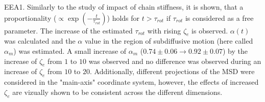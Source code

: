 \documentclass[
    paper=A4,pagesize=automedia,fontsize=12pt,
    BCOR=15mm,DIV=22,
    twoside,headinclude,footinclude=false,
    fleqn,             %
    bibliography=totocnumbered,          %
    listof=totoc,                %
    listof=flat,                 %
    cleardoublepage=empty      %
    numbers=endperiod
]{scrartcl}
\begin{document}
EEA1. Similarly to the study of impact of chain stiffness, it is shown,
that a proportionality ($\propto \exp\left(-\frac{t}{\tau_{rot}}\right)$) holds
for $t>\tau_{rot}$ if $\tau_{rot}$ is considered as a free parameter.
The increase of the estimated $\tau_{rot}$ with rising $\zeta_e$ is observed.
$\alpha(t)$ was calculated and the $\alpha$ value in the region of subdiffusive motion
(here called $\alpha_m$) was estimated. A small
increase of $\alpha_m$
($0.74 \pm 0.06 \rightarrow 0.92 \pm 0.07$) by the 
increase of $\zeta_e$ from $1$ to $10$ was observed and no difference was observed
during an increase of $\zeta_e$ from $10$ to $20$. Additionally, different projections
of the MSD were considered in the "main-axis" coordinate system, however, the effects of 
increased $\zeta_e$ are vizually shown to be consistent across the different dimensions.
\end{document}
